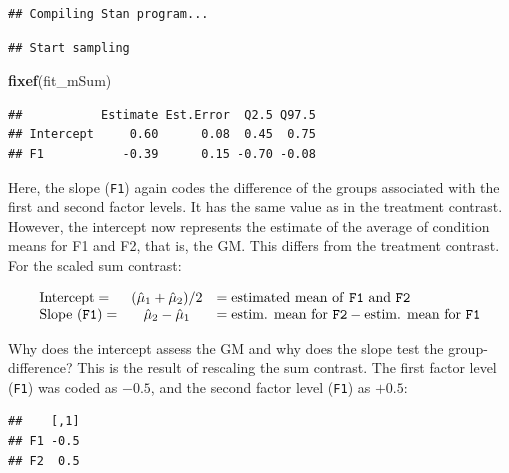 \documentclass[12pt,]{krantz}
\newenvironment{Shaded}{\begin{snugshade}}{\end{snugshade}}
\newcommand{\KeywordTok}[1]{\textcolor[rgb]{0.13,0.29,0.53}{\textbf{#1}}}
\newcommand{\NormalTok}[1]{#1}
\newcommand{\OperatorTok}[1]{\textcolor[rgb]{0.81,0.36,0.00}{\textbf{#1}}}
\theoremstyle{definition}
\theoremstyle{definition}
\theoremstyle{definition}
\theoremstyle{remark}
\begin{document}
\begin{verbatim}
## Compiling Stan program...
\end{verbatim}

\begin{verbatim}
## Start sampling
\end{verbatim}

\begin{Shaded}
\begin{Highlighting}[]
\KeywordTok{fixef}\NormalTok{(fit_mSum)}
\end{Highlighting}
\end{Shaded}

\begin{verbatim}
##           Estimate Est.Error  Q2.5 Q97.5
## Intercept     0.60      0.08  0.45  0.75
## F1           -0.39      0.15 -0.70 -0.08
\end{verbatim}

Here, the slope (\texttt{F1}) again codes the difference of the groups associated with the first and second factor levels. It has the same value as in the treatment contrast.
However, the intercept now represents the estimate of the average of condition means for F1 and F2, that is, the GM. This differs from the treatment contrast. For the scaled sum contrast:

\begin{equation}
\begin{array}{lcl}
\text{Intercept} = & (\hat{\mu}_1 + \hat{\mu}_2)/2 & = \text{estimated mean of \texttt{F1} and \texttt{F2}} \\
\text{Slope (\texttt{F1})} = & \hat{\mu}_2 - \hat{\mu}_1 & = \text{estim. mean for \texttt{F2}} - \text{estim. mean for \texttt{F1}} 
\end{array}
\label{def:beta2}
\end{equation}

Why does the intercept assess the GM and why does the slope test the group-difference? This is the result of rescaling the sum contrast. The first factor level (\texttt{F1}) was coded as \(-0.5\), and the second factor level (\texttt{F1}) as \(+0.5\):

\begin{Shaded}
\end{Shaded}

\begin{verbatim}
##    [,1]
## F1 -0.5
## F2  0.5
\end{verbatim}
\end{document}
